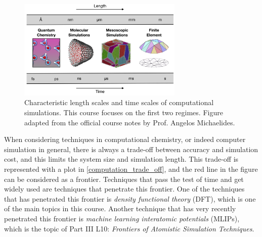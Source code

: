 \documentclass{article}
\theoremstyle{plain}\theoremheaderfont{\normalfont\itshape}\theorembodyfont{\rmfamily}\theoremseparator{.}\newtheorem*{rem}{Remark}\newtheorem*{ex}{Example}\newtheorem*{proof}{Proof}\newtheorem*{altp}{Alternative proof}
\theoremstyle{plain}\theoremheaderfont{\normalfont\bfseries}\theorembodyfont{\rmfamily}\theoremseparator{.}\newtheorem{thm}{Theorem}[section]\newtheorem{lem}[thm]{Lemma}\newtheorem{prop}[thm]{Proposition}\newtheorem*{cor}{Corollary}\newtheorem{defn}[thm]{Definition}\newtheorem{clm}[thm]{Claim}\newtheorem{clminproof}{Claim}\newtheorem{pos}{Postulate}[section]
\theoremstyle{break}\theoremheaderfont{\normalfont\itshape}\theorembodyfont{\rmfamily}\theoremseparator{.\medskip}\newtheorem*{proofskip}{Proof}\newtheorem*{exs}{Examples}\newtheorem*{rems}{Remarks}
\theoremstyle{break}\theoremheaderfont{\normalfont\bfseries}\theorembodyfont{\rmfamily}\theoremseparator{.\medskip}\newtheorem{lemskip}[thm]{Lemma}\newtheorem{defnskip}[thm]{Definition}\newtheorem{propskip}[thm]{Proposition}\newtheorem{thmskip}[thm]{Theorem}
\numberwithin{equation}{section}
\begin{document}
    \begin{figure}
        \centering
        \includegraphics[width=0.7\textwidth]{Computational Scales.png}
        \caption{Characteristic length scales and time scales of computational simulations. This course focuses on the first two regimes. Figure adapted from the official course notes by Prof. Angelos Michaelides.}
        \label{computational_scales}
    \end{figure}

    When considering techniques in computational chemistry, or indeed computer simulation in general, there is always a trade-off between accuracy and simulation cost, and this limits the system size and simulation length. This trade-off is represented with a plot in \cref{computation_trade_off}, and the red line in the figure can be considered as a frontier. Techniques that pass the test of time and get widely used are techniques that penetrate this frontier. One of the techniques that has penetrated this frontier is \textit{density functional theory} (DFT), which is one of the main topics in this course. Another technique that has very recently penetrated this frontier is \textit{machine learning interatomic potentials} (MLIPs), which is the topic of Part III L10: \textit{Frontiers of Atomistic Simulation Techniques}.
\end{document}
